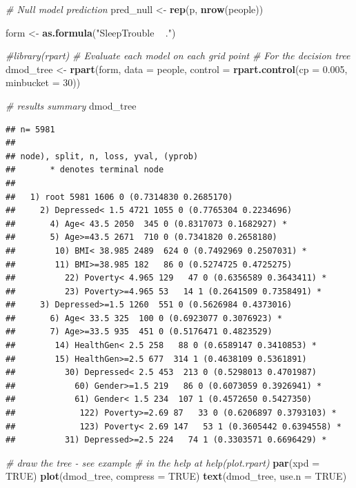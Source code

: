 \documentclass[]{article}
\newenvironment{Shaded}{\begin{snugshade}}{\end{snugshade}}
\newcommand{\KeywordTok}[1]{\textcolor[rgb]{0.13,0.29,0.53}{\textbf{{#1}}}}
\newcommand{\DataTypeTok}[1]{\textcolor[rgb]{0.13,0.29,0.53}{{#1}}}
\newcommand{\DecValTok}[1]{\textcolor[rgb]{0.00,0.00,0.81}{{#1}}}
\newcommand{\FloatTok}[1]{\textcolor[rgb]{0.00,0.00,0.81}{{#1}}}
\newcommand{\StringTok}[1]{\textcolor[rgb]{0.31,0.60,0.02}{{#1}}}
\newcommand{\CommentTok}[1]{\textcolor[rgb]{0.56,0.35,0.01}{\textit{{#1}}}}
\newcommand{\OtherTok}[1]{\textcolor[rgb]{0.56,0.35,0.01}{{#1}}}
\newcommand{\NormalTok}[1]{{#1}}
\begin{document}
\begin{Shaded}
\begin{Highlighting}[]
\CommentTok{# Null model prediction}
\NormalTok{pred_null <-}\StringTok{ }\KeywordTok{rep}\NormalTok{(p, }\KeywordTok{nrow}\NormalTok{(people))}

\NormalTok{form <-}\StringTok{ }\KeywordTok{as.formula}\NormalTok{(}\StringTok{"SleepTrouble ~ ."}\NormalTok{)}

\CommentTok{#library(rpart)}
\CommentTok{# Evaluate each model on each grid point}
\CommentTok{# For the decision tree}
\NormalTok{dmod_tree <-}\StringTok{ }\KeywordTok{rpart}\NormalTok{(form, }\DataTypeTok{data =} \NormalTok{people, }
                   \DataTypeTok{control =} \KeywordTok{rpart.control}\NormalTok{(}\DataTypeTok{cp =} \FloatTok{0.005}\NormalTok{, }\DataTypeTok{minbucket =} \DecValTok{30}\NormalTok{))}

\CommentTok{# results summary}
\NormalTok{dmod_tree}
\end{Highlighting}
\end{Shaded}

\begin{verbatim}
## n= 5981 
## 
## node), split, n, loss, yval, (yprob)
##       * denotes terminal node
## 
##   1) root 5981 1606 0 (0.7314830 0.2685170)  
##     2) Depressed< 1.5 4721 1055 0 (0.7765304 0.2234696)  
##       4) Age< 43.5 2050  345 0 (0.8317073 0.1682927) *
##       5) Age>=43.5 2671  710 0 (0.7341820 0.2658180)  
##        10) BMI< 38.985 2489  624 0 (0.7492969 0.2507031) *
##        11) BMI>=38.985 182   86 0 (0.5274725 0.4725275)  
##          22) Poverty< 4.965 129   47 0 (0.6356589 0.3643411) *
##          23) Poverty>=4.965 53   14 1 (0.2641509 0.7358491) *
##     3) Depressed>=1.5 1260  551 0 (0.5626984 0.4373016)  
##       6) Age< 33.5 325  100 0 (0.6923077 0.3076923) *
##       7) Age>=33.5 935  451 0 (0.5176471 0.4823529)  
##        14) HealthGen< 2.5 258   88 0 (0.6589147 0.3410853) *
##        15) HealthGen>=2.5 677  314 1 (0.4638109 0.5361891)  
##          30) Depressed< 2.5 453  213 0 (0.5298013 0.4701987)  
##            60) Gender>=1.5 219   86 0 (0.6073059 0.3926941) *
##            61) Gender< 1.5 234  107 1 (0.4572650 0.5427350)  
##             122) Poverty>=2.69 87   33 0 (0.6206897 0.3793103) *
##             123) Poverty< 2.69 147   53 1 (0.3605442 0.6394558) *
##          31) Depressed>=2.5 224   74 1 (0.3303571 0.6696429) *
\end{verbatim}

\begin{Shaded}
\begin{Highlighting}[]
\CommentTok{# draw the tree - see example}
\CommentTok{# in the help at help(plot.rpart)}
\KeywordTok{par}\NormalTok{(}\DataTypeTok{xpd =} \OtherTok{TRUE}\NormalTok{)}
\KeywordTok{plot}\NormalTok{(dmod_tree, }\DataTypeTok{compress =} \OtherTok{TRUE}\NormalTok{)}
\KeywordTok{text}\NormalTok{(dmod_tree, }\DataTypeTok{use.n =} \OtherTok{TRUE}\NormalTok{)}
\end{Highlighting}
\end{Shaded}
\end{document}
